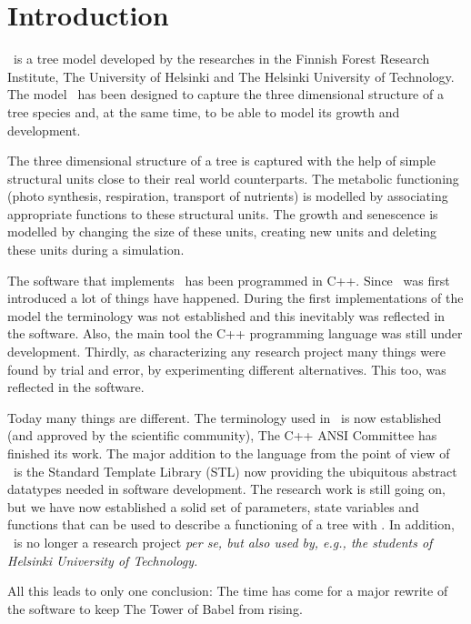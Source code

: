\section{Introduction}

\lignum\ is a tree model developed by the researches 
in the Finnish Forest Research Institute, The University of Helsinki
and The Helsinki University of Technology.
The model \lignum\ has been designed to capture the three dimensional
structure of a tree species and, at the same time, to be able 
to model its growth and development.

The three dimensional structure of a tree is captured with the
help of simple structural units close to their real
world counterparts. The metabolic functioning (photo synthesis, 
respiration, transport of nutrients) is modelled by associating 
appropriate functions to these structural units. The
growth and senescence is modelled by changing the size 
of these units, creating new units and deleting these units
during a simulation.

The software that implements \lignum\ has been programmed in C++. 
Since \lignum\ was first introduced \cite{salminen:omt94, perttunen:aob96} a lot
of things have happened. During the first implementations of the model 
the terminology was not established and this inevitably
was reflected  in the software. Also, the main tool the C++ 
programming language was still under development. 
Thirdly, as characterizing any
research project many things were found by trial and error, by 
experimenting different alternatives. This too, was reflected in the software.

Today many things are different. The terminology used in \lignum\
is now established (and approved by the scientific community), 
The C++ ANSI Committee has finished its work. 
The major addition to the language from the
point of view of \lignum\ is the Standard Template Library (STL)
now providing the ubiquitous abstract datatypes needed in
software development. The research
work is still going on, but we have now established a solid set of
parameters, state variables and functions that can be
used to describe a functioning of a tree with \lignum. In addition,
\lignum\ is no longer a research project \it per se\rm, but also
used by, e.g., the students of Helsinki University of Technology.

All this leads to only one conclusion: The time has come for
a major rewrite of the software to keep The Tower of Babel from rising.       

